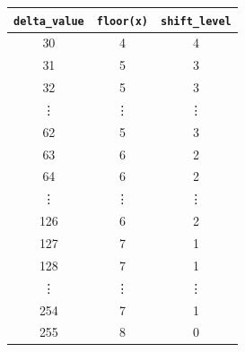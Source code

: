 \documentclass{article}
\begin{document}
\begin{itemize}
\begin{table}[h]
\begin{tabular}{||c|c|c||}
              \end{tabular}\hspace{20pt}
              \begin{tabular}{||c|c|c||}
                  \hline
                  \texttt{delta\_value} & \texttt{floor(x)\footnotemark[\value{footnote}]} & \texttt{shift\_level} \\
                  \hline \hline
                  30                    & 4                                                & 4                     \\\hline
                  31                    & 5                                                & 3                     \\\hline
                  32                    & 5                                                & 3                     \\\hline
                  \vdots                & \vdots                                           & \vdots                \\\hline
                  62                    & 5                                                & 3                     \\\hline
                  63                    & 6                                                & 2                     \\\hline
                  64                    & 6                                                & 2                     \\\hline
                  \vdots                & \vdots                                           & \vdots                \\\hline
                  126                   & 6                                                & 2                     \\\hline
                  127                   & 7                                                & 1                     \\\hline
                  128                   & 7                                                & 1                     \\\hline
                  \vdots                & \vdots                                           & \vdots                \\\hline
                  254                   & 7                                                & 1                     \\\hline
                  255                   & 8                                                & 0                     \\\hline
              \end{tabular}
          \end{table}
          \vspace{0,2cm}


\end{itemize}
\end{document}
